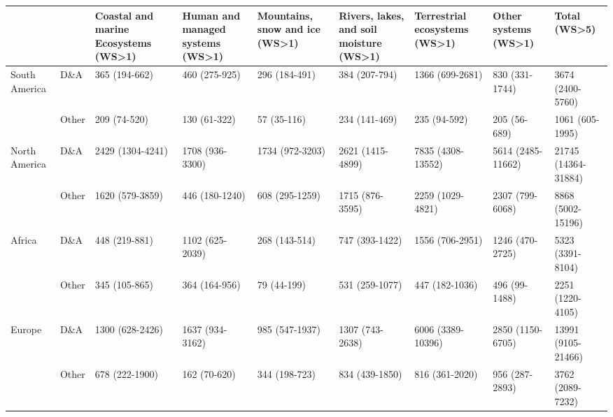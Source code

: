 \begin{tabular}{ll |p{1.5cm} p{1.5cm} p{1.5cm} p{1.5cm} p{1.5cm} p{1.5cm} p{1.5cm}}
\toprule
                 &       & Coastal and marine Ecosystems (WS>1) & Human and managed systems (WS>1) & Mountains, snow and ice (WS>1) & Rivers, lakes, and soil moisture (WS>1) & Terrestrial ecosystems (WS>1) &       Other systems (WS>1) &                Total (WS>5) \\
\midrule
South America & D\&A &                 365 \mbox{(194-662)} &             460 \mbox{(275-925)} &           296 \mbox{(184-491)} &                    384 \mbox{(207-794)} &        1366 \mbox{(699-2681)} &      830 \mbox{(331-1744)} &     3674 \mbox{(2400-5760)} \\
                 & Other &                  209 \mbox{(74-520)} &              130 \mbox{(61-322)} &             57 \mbox{(35-116)} &                    234 \mbox{(141-469)} &           235 \mbox{(94-592)} &        205 \mbox{(56-689)} &      1061 \mbox{(605-1995)} \\
North America & D\&A &              2429 \mbox{(1304-4241)} &           1708 \mbox{(936-3300)} &         1734 \mbox{(972-3203)} &                 2621 \mbox{(1415-4899)} &      7835 \mbox{(4308-13552)} &   5614 \mbox{(2485-11662)} &  21745 \mbox{(14364-31884)} \\
                 & Other &               1620 \mbox{(579-3859)} &            446 \mbox{(180-1240)} &          608 \mbox{(295-1259)} &                  1715 \mbox{(876-3595)} &       2259 \mbox{(1029-4821)} &     2307 \mbox{(799-6068)} &    8868 \mbox{(5002-15196)} \\
Africa & D\&A &                 448 \mbox{(219-881)} &           1102 \mbox{(625-2039)} &           268 \mbox{(143-514)} &                   747 \mbox{(393-1422)} &        1556 \mbox{(706-2951)} &     1246 \mbox{(470-2725)} &     5323 \mbox{(3391-8104)} \\
                 & Other &                 345 \mbox{(105-865)} &             364 \mbox{(164-956)} &             79 \mbox{(44-199)} &                   531 \mbox{(259-1077)} &         447 \mbox{(182-1036)} &       496 \mbox{(99-1488)} &     2251 \mbox{(1220-4105)} \\
Europe & D\&A &               1300 \mbox{(628-2426)} &           1637 \mbox{(934-3162)} &          985 \mbox{(547-1937)} &                  1307 \mbox{(743-2638)} &      6006 \mbox{(3389-10396)} &    2850 \mbox{(1150-6705)} &   13991 \mbox{(9105-21466)} \\
                 & Other &                678 \mbox{(222-1900)} &              162 \mbox{(70-620)} &           344 \mbox{(198-723)} &                   834 \mbox{(439-1850)} &         816 \mbox{(361-2020)} &      956 \mbox{(287-2893)} &     3762 \mbox{(2089-7232)} \\

\end{tabular}
